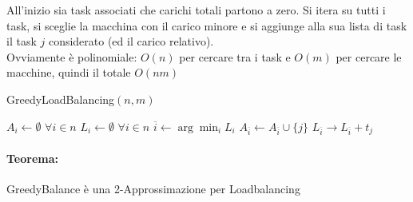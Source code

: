 All'inizio sia task associati che carichi totali partono a zero. Si itera su tutti i task, si sceglie la macchina con il carico minore e si aggiunge alla sua lista di task il task $j$ considerato (ed il carico relativo).\\
Ovviamente è polinomiale: $O(n)$ per cercare tra i task e $O(m)$ per cercare le macchine, quindi il totale $O(nm)$

\begin{algorithm}
	\caption{GreedyLoadBalancing$(n, m)$}
	\begin{algorithmic}
		\STATE $A_i \leftarrow \emptyset$ $\forall i \in n$
		\STATE $L_i \leftarrow \emptyset$ $\forall i \in n$
		\STATE $\overline{i} \leftarrow \arg \min_i L_i$
		\STATE $A_{\overline{i}} \leftarrow A_{\overline{i}} \cup \{j\}$
		\STATE $L_{\overline{i}} \rightarrow L_{\overline{i}} + t_j$
		\ENDFOR
	\end{algorithmic}
\end{algorithm}

\paragraph{Teorema:} GreedyBalance è una 2-Approssimazione per Loadbalancing

